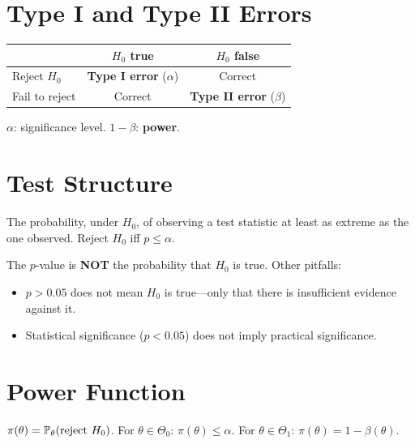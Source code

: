 \section{Type I and Type II Errors}

\begin{definition}
\begin{center}
\begin{tabular}{l|cc}
& $H_0$ true & $H_0$ false \\
\hline
Reject $H_0$ & \textbf{Type I error} ($\alpha$) & Correct \\
Fail to reject & Correct & \textbf{Type II error} ($\beta$) \\
\end{tabular}
\end{center}
$\alpha$: significance level. $1-\beta$: \textbf{power}.
\end{definition}

\section{Test Structure}

\begin{definition}[$p$-value]
The probability, under $H_0$, of observing a test statistic at least as extreme as the one observed. Reject $H_0$ iff $p\leq\alpha$.
\end{definition}

\begin{warning}
The $p$-value is \textbf{NOT} the probability that $H_0$ is true. Other pitfalls:
\begin{itemize}
\item $p>0.05$ does not mean $H_0$ is true---only that there is insufficient evidence against it.
\item Statistical significance ($p<0.05$) does not imply practical significance.
\end{itemize}
\end{warning}

\section{Power Function}

\begin{definition}
$\pi(\theta) = \mathbb{P}_\theta(\text{reject } H_0)$. For $\theta\in\Theta_0$: $\pi(\theta)\leq\alpha$. For $\theta\in\Theta_1$: $\pi(\theta)=1-\beta(\theta)$.
\end{definition}

